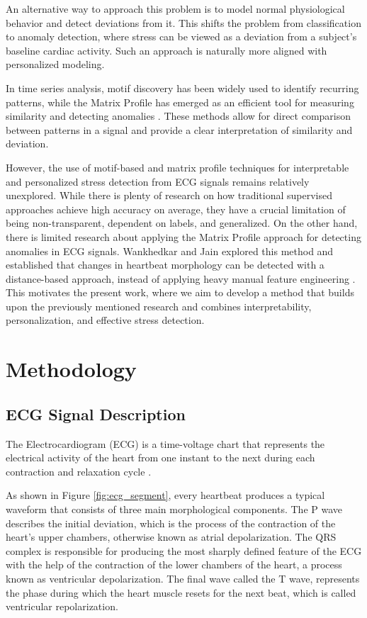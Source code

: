 \documentclass[conference,10pt]{IEEEtran}
\begin{document}
An alternative way to approach this problem is to model normal physiological behavior and detect deviations from it. This shifts the problem from classification to anomaly detection, where stress can be viewed as a deviation from a subject’s baseline cardiac activity. Such an approach is naturally more aligned with personalized modeling.

In time series analysis, motif discovery has been widely used to identify recurring patterns, while the Matrix Profile has emerged as an efficient tool for measuring similarity and detecting anomalies \cite{r6,r7}. 
These methods allow for direct comparison between patterns in a signal and provide a clear interpretation of similarity and deviation.

However, the use of motif-based and matrix profile techniques for interpretable and personalized stress detection from ECG signals remains relatively unexplored. While there is plenty of research on how traditional supervised approaches achieve high accuracy on average, they have a crucial limitation of being non-transparent, dependent on labels, and generalized. On the other hand, there is limited research about applying the Matrix Profile approach for detecting anomalies in ECG signals. Wankhedkar and Jain explored this method and established that changes in heartbeat morphology can be detected with a distance-based approach, instead of applying heavy manual feature engineering \cite{r11} .  
This motivates the present work, where we aim to develop a method that builds upon the previously mentioned research and combines interpretability, personalization, and effective stress detection.


\section{Methodology}

\subsection{ECG Signal Description}

The Electrocardiogram (ECG) is a time-voltage chart that represents the electrical activity of the heart from one instant to the next during each contraction and relaxation cycle \cite{r12}.

As shown in Figure \ref{fig:ecg_segment}, every heartbeat produces a typical waveform that consists of three main morphological components. The P wave describes the initial deviation, which is the process of the contraction of the heart’s upper chambers, otherwise known as atrial depolarization. The QRS complex is responsible for producing the most sharply defined feature of the ECG with the help of the contraction of the lower chambers of the heart, a process known as ventricular depolarization. The final wave called the T wave, represents the phase during which the heart muscle resets for the next beat, which is called ventricular repolarization.  
\end{document}
